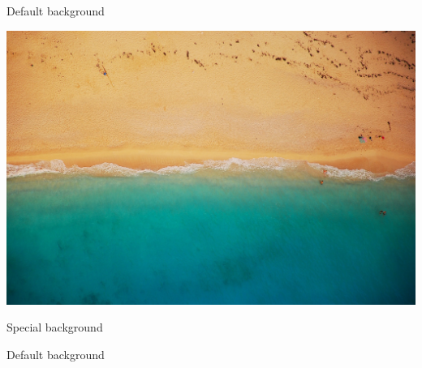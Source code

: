 \documentclass{beamer}
\begin{document}
\begin{frame} {Default background}

\end{frame}

{
  {%
    \includegraphics[width=\paperwidth,height=\paperheight]{nature2.jpg}
  }
  
\begin{frame} {Special background}

\end{frame}
}

\begin{frame} {Default background}

\end{frame}
\end{document}
